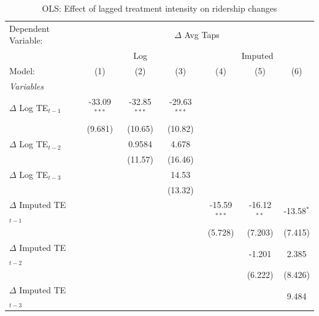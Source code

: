 
\begin{table}[htbp]
   \caption{\label{tab:ols_results} OLS: Effect of lagged treatment intensity on ridership changes}
   \centering
   \footnotesize
   \begin{tabular}{lcccccc}
      \tabularnewline \midrule \midrule
      Dependent Variable: & \multicolumn{6}{c}{$\Delta$ Avg Taps}\\
       & \multicolumn{3}{c}{Log} & \multicolumn{3}{c}{Imputed} \\ 
      Model:                       & (1)            & (2)            & (3)            & (4)            & (5)           & (6)\\  
      \midrule
      \emph{Variables}\\
      $\Delta$ Log TE$_{t-1}$      & -33.09$^{***}$ & -32.85$^{***}$ & -29.63$^{***}$ &                &               &   \\   
                                   & (9.681)        & (10.65)        & (10.82)        &                &               &   \\   
      $\Delta$ Log TE$_{t-2}$      &                & 0.9584         & 4.678          &                &               &   \\   
                                   &                & (11.57)        & (16.46)        &                &               &   \\   
      $\Delta$ Log TE$_{t-3}$      &                &                & 14.53          &                &               &   \\   
                                   &                &                & (13.32)        &                &               &   \\   
      $\Delta$ Imputed TE$_{t-1}$  &                &                &                & -15.59$^{***}$ & -16.12$^{**}$ & -13.58$^{*}$\\   
                                   &                &                &                & (5.728)        & (7.203)       & (7.415)\\   
      $\Delta$ Imputed TE$_{t-2}$  &                &                &                &                & -1.201        & 2.385\\   
                                   &                &                &                &                & (6.222)       & (8.426)\\   
      $\Delta$ Imputed TE$_{t-3}$  &                &                &                &                &               & 9.484\\   

\end{tabular}
\end{table}
